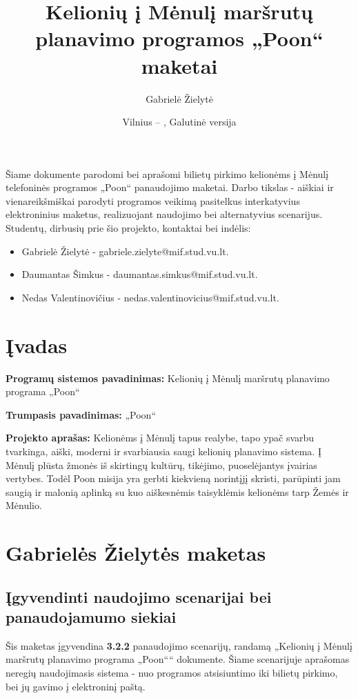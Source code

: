 \documentclass{VUMIFPSkursinis}
\title{Kelionių į Mėnulį maršrutų planavimo programos „Poon“ maketai}
\author{Gabrielė Žielytė}
\date{Vilnius – \the\year, Galutinė versija}
\begin{document}
	
\maketitle


Šiame dokumente parodomi bei aprašomi bilietų pirkimo kelionėms į Mėnulį telefoninės programos „Poon“ panaudojimo maketai. Darbo tikslas - aiškiai ir vienareikšmiškai parodyti programos veikimą pasitelkus interkatyvius elektroninius maketus, realizuojant naudojimo bei alternatyvius scenarijus. Studentų, dirbusių prie šio projekto, kontaktai bei indėlis:
\begin{itemize}
\item Gabrielė Žielytė - gabriele.zielyte@mif.stud.vu.lt. 
\item Daumantas Šimkus - daumantas.simkus@mif.stud.vu.lt. 
\item Nedas Valentinovičius - nedas.valentinovicius@mif.stud.vu.lt. 
\end{itemize}
\thispagestyle{empty}

\thispagestyle{empty}
\tableofcontents

\cleardoublepage{}
\setcounter{page}{4}

\section{Įvadas}
\textbf{Programų sistemos pavadinimas: } Kelionių į Mėnulį maršrutų planavimo programa „Poon“
\bigskip

\textbf{Trumpasis pavadinimas: } „Poon“
\bigskip




\textbf{Projekto aprašas: } Kelionėms į Mėnulį tapus realybe, tapo ypač svarbu tvarkinga, aiški, moderni ir svarbiausia saugi kelionių planavimo sistema. Į Mėnulį plūsta žmonės iš skirtingų kultūrų, tikėjimo, puoselėjantys įvairias vertybes. Todėl Poon misija yra gerbti kiekvieną norintįjį skristi, parūpinti jam saugią ir malonią aplinką su kuo aiškesnėmis taisyklėmis kelionėms tarp Žemės ir Mėnulio.

\section{Gabrielės Žielytės maketas}
\subsection{Įgyvendinti naudojimo scenarijai bei panaudojamumo siekiai}
Šis maketas įgyvendina \textbf{3.2.2} panaudojimo scenarijų, randamą „Kelionių į Mėnulį maršrutų planavimo programa „Poon““ dokumente. Šiame scenarijuje aprašomas neregių naudojimasis sistema - nuo programos atsisiuntimo iki bilietų pirkimo, bei jų gavimo į elektroninį paštą.
\end{document}

